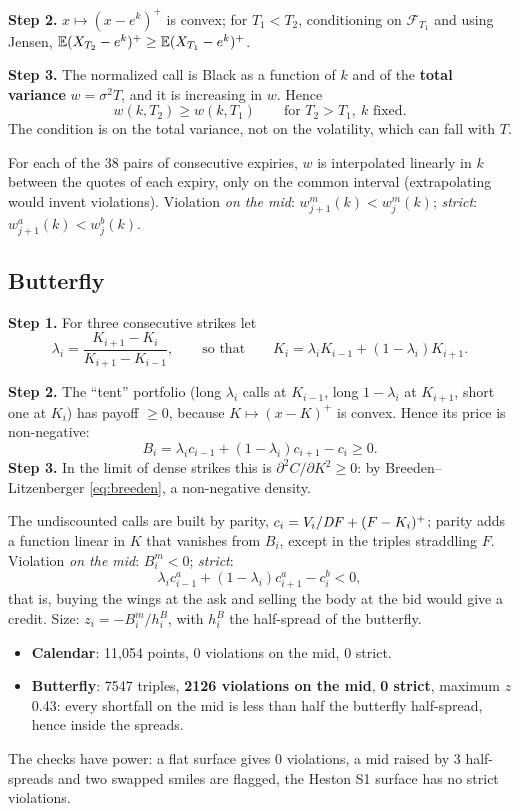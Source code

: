 \noindent\textbf{Step 2.} $x\mapsto(x-e^k)^+$ is convex; for $T_1<T_2$, conditioning on $\mathcal F_{T_1}$ and using
Jensen, $\mathbb{E}(X_{T_2}-e^k)^+\ge\mathbb{E}(X_{T_1}-e^k)^+$.

\noindent\textbf{Step 3.} The normalized call is Black as a function of $k$ and of the \textbf{total variance}
$w=\sigma^2T$, and it is increasing in $w$. Hence
\begin{equation}\label{eq:cal-calendario}
w(k,T_2)\ge w(k,T_1)\qquad\text{for } T_2>T_1,\ k\text{ fixed}.
\end{equation}
The condition is on the total variance, not on the volatility, which can fall with $T$.

For each of the 38 pairs of consecutive expiries, $w$ is interpolated linearly in $k$ between the quotes of each
expiry, only on the common interval (extrapolating would invent violations). Violation \emph{on the mid}:
$w^m_{j+1}(k)<w^m_j(k)$; \emph{strict}: $w^a_{j+1}(k)<w^b_j(k)$.

\subsection{Butterfly}
\noindent\textbf{Step 1.} For three consecutive strikes let
\[
\lambda_i=\frac{K_{i+1}-K_i}{K_{i+1}-K_{i-1}},\qquad\text{so that}\qquad K_i=\lambda_iK_{i-1}+(1-\lambda_i)K_{i+1}.
\]

\noindent\textbf{Step 2.} The ``tent'' portfolio (long $\lambda_i$ calls at $K_{i-1}$, long $1-\lambda_i$ at
$K_{i+1}$, short one at $K_i$) has payoff $\ge0$, because $K\mapsto(x-K)^+$ is convex. Hence its price is
non-negative:
\begin{equation}\label{eq:cal-butterfly}
B_i=\lambda_ic_{i-1}+(1-\lambda_i)c_{i+1}-c_i\ge0 .
\end{equation}
\noindent\textbf{Step 3.} In the limit of dense strikes this is $\partial^2C/\partial K^2\ge0$: by
Breeden--Litzenberger \eqref{eq:breeden}, a non-negative density.

The undiscounted calls are built by parity, $c_i=V_i/\mathit{DF}+(F-K_i)^+$; parity adds a function linear in $K$ that
vanishes from $B_i$, except in the triples straddling $F$. Violation \emph{on the mid}: $B^m_i<0$; \emph{strict}:
\[
\lambda_ic^a_{i-1}+(1-\lambda_i)c^a_{i+1}-c^b_i<0,
\]
that is, buying the wings at the ask and selling the body at the bid would give a credit. Size: $z_i=-B^m_i/h^B_i$,
with $h^B_i$ the half-spread of the butterfly.

\begin{progetto}[title={In the qpricer project: the SPX surface}]
\begin{itemize}
\item \textbf{Calendar}: 11{,}054 points, 0 violations on the mid, 0 strict.
\item \textbf{Butterfly}: 7547 triples, \textbf{2126 violations on the mid}, \textbf{0 strict}, maximum $z$ 0.43:
every shortfall on the mid is less than half the butterfly half-spread, hence inside the spreads.
\end{itemize}
The checks have power: a flat surface gives 0 violations, a mid raised by 3 half-spreads and two swapped smiles are
flagged, the Heston S1 surface has no strict violations.
\end{progetto}

